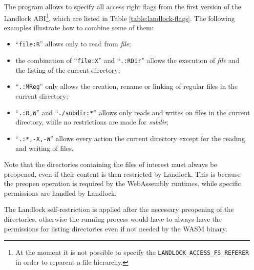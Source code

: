 The program allows to specify all access right flags from the first version of the Landlock
ABI\footnote{At the moment it is not possible to specify the \texttt{LANDLOCK\_ACCESS\_FS\_REFERER} in order to reparent a file hierarchy.},
which are listed in Table \ref{table:landlock-flags}.
The following examples illustrate how to combine some of them:
\begin{itemize}
  \item ``\texttt{file:R}'' allows only to read from \textit{file};
  \item the combination of ``\texttt{file:X}'' and ``\texttt{.:RDir}'' allows the execution of \textit{file} and the listing of the current directory;
  \item ``\texttt{.:MReg}'' only allows the creation, rename or linking of regular files in the current directory;
  \item ``\texttt{.:R,W}'' and ``\texttt{./subdir:*}'' allows only reads and writes on files in the current directory, while no restrictions are
        made for \textit{subdir};
  \item ``\texttt{.:*,-X,-W}'' allows every action the current directory except for the reading and writing of files.
\end{itemize}

Note that the directories containing the files of interest must always be preopened,
even if their content is then restricted by Landlock. This is because the preopen operation
is required by the WebAssembly runtimes, while specific permissions are handled by Landlock.

The Landlock self-restriction is applied after the necessary preopening of the directories,
otherwise the running process would have to always have the permissions for listing directories even if
not needed by the WASM binary.

\vspace*{1cm}


